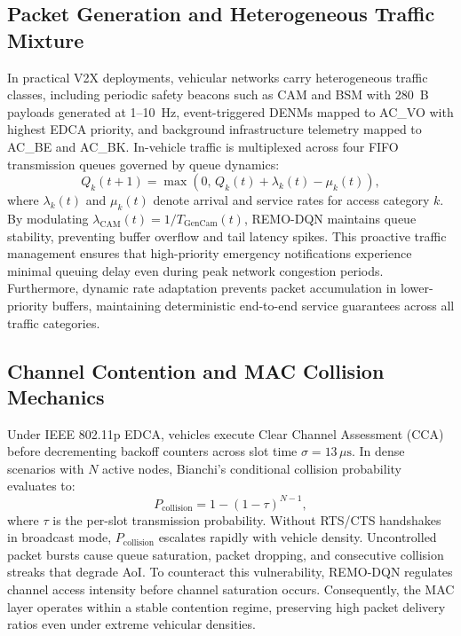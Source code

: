 \documentclass[journal]{IEEEtran}
\begin{document}
\subsection{Packet Generation and Heterogeneous Traffic Mixture}
In practical V2X deployments, vehicular networks carry heterogeneous traffic classes, including periodic safety beacons such as CAM and BSM with 280~B payloads generated at 1--10~Hz, event-triggered DENMs mapped to AC\_VO with highest EDCA priority, and background infrastructure telemetry mapped to AC\_BE and AC\_BK. In-vehicle traffic is multiplexed across four FIFO transmission queues governed by queue dynamics:
\begin{equation}
\label{eq:queue_dyn}
Q_k(t+1) = \max\left(0, \, Q_k(t) + \lambda_k(t) - \mu_k(t)\right),
\end{equation}
where $\lambda_k(t)$ and $\mu_k(t)$ denote arrival and service rates for access category $k$. By modulating $\lambda_{\text{CAM}}(t) = 1/T_{\text{GenCam}}(t)$, REMO-DQN maintains queue stability, preventing buffer overflow and tail latency spikes. This proactive traffic management ensures that high-priority emergency notifications experience minimal queuing delay even during peak network congestion periods. Furthermore, dynamic rate adaptation prevents packet accumulation in lower-priority buffers, maintaining deterministic end-to-end service guarantees across all traffic categories.

\subsection{Channel Contention and MAC Collision Mechanics}
Under IEEE 802.11p EDCA, vehicles execute Clear Channel Assessment (CCA) before decrementing backoff counters across slot time $\sigma = 13\,\mu\text{s}$. In dense scenarios with $N$ active nodes, Bianchi's conditional collision probability evaluates to:
\begin{equation}
\label{eq:bianchi_collision}
P_{\text{collision}} = 1 - (1 - \tau)^{N-1},
\end{equation}
where $\tau$ is the per-slot transmission probability. Without RTS/CTS handshakes in broadcast mode, $P_{\text{collision}}$ escalates rapidly with vehicle density. Uncontrolled packet bursts cause queue saturation, packet dropping, and consecutive collision streaks that degrade AoI. To counteract this vulnerability, REMO-DQN regulates channel access intensity before channel saturation occurs. Consequently, the MAC layer operates within a stable contention regime, preserving high packet delivery ratios even under extreme vehicular densities.
\end{document}

